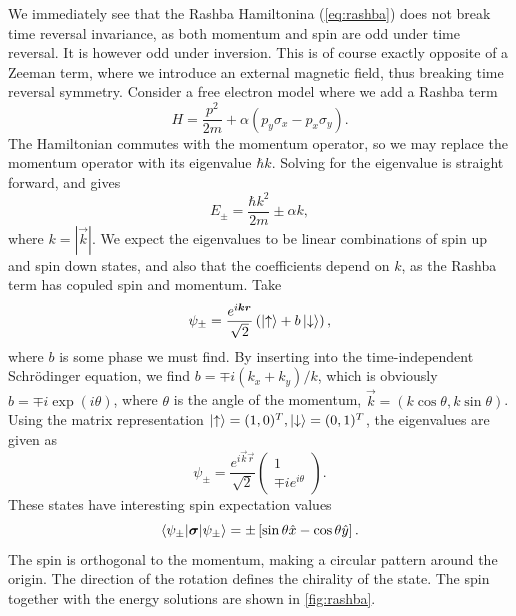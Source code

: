 We immediately see that the Rashba Hamiltonina (\ref{eq:rashba}) does not break time reversal invariance, as both momentum and spin are odd under time reversal.
It is however odd under inversion.
This is of course exactly opposite of a Zeeman term, where we introduce an external magnetic field, thus breaking time reversal symmetry.
Consider a free electron model where we add a Rashba term
\begin{equation}
  H = \frac{p^2}{2m} + \alpha (p_y \sigma _x - p_x \sigma _y).
\end{equation}
The Hamiltonian commutes with the momentum operator, so we may replace the momentum operator with its eigenvalue $\hbar k$.
Solving for the eigenvalue is straight forward, and gives
\begin{equation}
  E_{\pm} = \frac{\hbar k^2}{2m} \pm \alpha k,
\end{equation}
where $k=|\vec{k}|$.
We expect the eigenvalues to be linear combinations of spin up and spin down states, and also that the coefficients depend on $k$, as the Rashba term has copuled spin and momentum.
Take
\begin{equation}
  \psi_{\pm} = \frac{e^{i \bm{k} \bm{r}}}{\sqrt{2}} \left( \ket{\uparrow} + b \ket{\downarrow} \right),
\end{equation}
where $b$ is some phase we must find.
By inserting into the time-independent Schrödinger equation, we find $b = \mp i (k_x + k_y ) /k$, which is obviously $b=\mp i \exp (i \theta )$, where $\theta $ is the angle of the momentum, $\vec{k} = (k \cos \theta , k \sin \theta)$.
Using the matrix representation $\ket{\uparrow} = (1,0)^T, \ket{\downarrow} = (0,1)^T$, the eigenvalues are given as
\begin{equation}
  \psi _{\pm} =
  \frac{e^{i \vec{k} \vec{r}}}{\sqrt{2}}
  \begin{pmatrix}
    1\\
    \mp i e^{i \theta }
  \end{pmatrix}.
\end{equation}
These states have interesting spin expectation values
\begin{equation}
  \braket{\psi_{\pm} | \bm{\sigma} | \psi _{\pm}}
  =
  \pm
  \left[  
    \sin\theta \hat{x} - \cos \theta \hat{y}
  \right].
\end{equation}
The spin is orthogonal to the momentum, making a circular pattern around the origin.
The direction of the rotation defines the chirality of the state.
The spin together with the energy solutions are shown in \cref{fig:rashba}.


